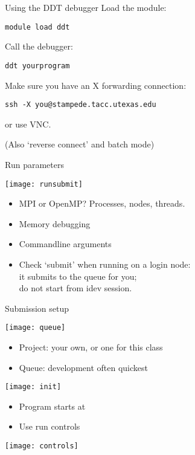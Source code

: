 \documentclass[11pt,headernav]{beamer}
\newcounter{tacc}
\begin{document}
\begin{frame}[containsverbatim]{Using the DDT debugger}
  Load the module:
\begin{verbatim}
module load ddt
\end{verbatim}
Call the debugger:
\begin{verbatim}
ddt yourprogram
\end{verbatim}
Make sure you have an X forwarding connection:
\begin{verbatim}
ssh -X you@stampede.tacc.utexas.edu
\end{verbatim}
or use VNC.

(Also `reverse connect' and batch mode)
\end{frame}

\begin{frame}[containsverbatim]{Run parameters}
  \begin{multicols}{2}
    \texttt{[image: runsubmit]}
    \columnbreak
    \begin{itemize}
    \item MPI or OpenMP? Processes, nodes, threads.
    \item Memory debugging
    \item Commandline arguments
    \item Check `submit' when running on a login node:\\
      it submits to the queue for you;\\
      do not start from idev session.
    \end{itemize}
  \end{multicols}
\end{frame}

\begin{frame}[containsverbatim]{Submission setup}
  \begin{multicols}{2}
    \texttt{[image: queue]}
    \columnbreak
    \begin{itemize}
    \item Project: your own, or one for this class
    \item Queue: development often quickest
    \end{itemize}
  \end{multicols}
\end{frame}

\begin{frame}[containsverbatim]{}
  \texttt{[image: init]}
  \begin{itemize}
  \item Program starts at 
  \item Use run controls
  \end{itemize}
\texttt{[image: controls]}
\end{frame}
\end{document}
